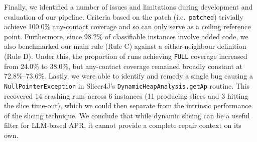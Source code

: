 \documentclass[sigconf,nonacm]{acmart}
\begin{document}
Finally, we identified a number of issues and limitations during development and evaluation of our pipeline. Criteria based on the patch (i.e.\ \texttt{patched}) trivially achieve 100.0\% any-contact coverage and so can only serve as a ceiling reference point. Furthermore, since 98.2\% of classifiable instances involve added code, we also benchmarked our main rule (Rule C) against a either-neighbour definition (Rule D). Under this, the proportion of runs achieving \texttt{FULL} coverage increased from 24.0\% to 38.0\%, but any-contact coverage remained broadly constant at 72.8\%--73.6\%. Lastly, we were able to identify and remedy a single bug \newline causing a \texttt{NullPointerException} in Slicer4J's \newline
\texttt{DynamicHeapAnalysis.getAp} routine. This recovered 14 crashing runs across 6 instances (11 producing slices and 3 hitting the slice time-out), which we could then separate from the intrinsic performance of the slicing technique. We conclude that while dynamic slicing can be a useful filter for LLM-based APR, it cannot provide a complete repair context on its own.



\end{document}
